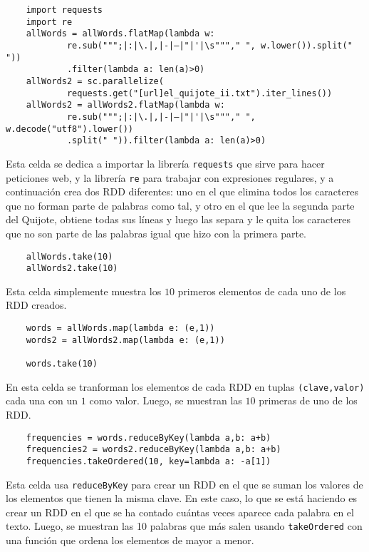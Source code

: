 \documentclass[11pt]{article}
\def\inline{\lstinline[basicstyle=\ttfamily,keywordstyle={}]}
\begin{document}
\begin{verbatim}
	import requests
	import re
	allWords = allWords.flatMap(lambda w: 
	        re.sub(""";|:|\.|,|-|–|"|'|\s"""," ", w.lower()).split(" "))
	        .filter(lambda a: len(a)>0)
	allWords2 = sc.parallelize(
	        requests.get("[url]el_quijote_ii.txt").iter_lines())
	allWords2 = allWords2.flatMap(lambda w: 
	        re.sub(""";|:|\.|,|-|–|"|'|\s"""," ", w.decode("utf8").lower())
	        .split(" ")).filter(lambda a: len(a)>0)
\end{verbatim}

Esta celda se dedica a importar la librería \inline{requests} que sirve para hacer peticiones web, y la librería \inline{re} para trabajar con expresiones regulares, y a continuación crea dos RDD diferentes: uno en el que elimina todos los caracteres que no forman parte de palabras como tal, y otro en el que lee la segunda parte del Quijote, obtiene todas sus líneas y luego las separa y le quita los caracteres que no son parte de las palabras igual que hizo con la primera parte.

\begin{verbatim}
	allWords.take(10)
	allWords2.take(10)
\end{verbatim}

Esta celda simplemente muestra los $10$ primeros elementos de cada uno de los RDD creados.


\begin{verbatim}
    words = allWords.map(lambda e: (e,1))
    words2 = allWords2.map(lambda e: (e,1))
    
    words.take(10)
\end{verbatim}

En esta celda se tranforman los elementos de cada RDD en tuplas \inline{(clave,valor)} cada una con un $1$ como valor. Luego, se muestran las $10$ primeras de uno de los RDD.

\begin{verbatim}
    frequencies = words.reduceByKey(lambda a,b: a+b)
    frequencies2 = words2.reduceByKey(lambda a,b: a+b)
    frequencies.takeOrdered(10, key=lambda a: -a[1])
\end{verbatim}

Esta celda usa \inline{reduceByKey} para crear un RDD en el que se suman los valores de los elementos que tienen la misma clave. En este caso, lo que se está haciendo es crear un RDD en el que se ha contado cuántas veces aparece cada palabra en el texto. Luego, se muestran las 10 palabras que más salen usando \inline{takeOrdered} con una función que ordena los elementos de mayor a menor.
\end{document}
